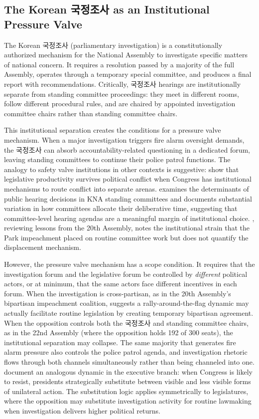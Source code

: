 \documentclass[11pt]{article}
\begin{document}
\subsection{The Korean 국정조사 as an Institutional Pressure Valve}

The Korean 국정조사 (parliamentary investigation) is a constitutionally authorized mechanism for the National Assembly to investigate specific matters of national concern. It requires a resolution passed by a majority of the full Assembly, operates through a temporary special committee, and produces a final report with recommendations. Critically, 국정조사 hearings are institutionally separate from standing committee proceedings: they meet in different rooms, follow different procedural rules, and are chaired by appointed investigation committee chairs rather than standing committee chairs.

This institutional separation creates the conditions for a pressure valve mechanism. When a major investigation triggers fire alarm oversight demands, the 국정조사 can absorb accountability-related questioning in a dedicated forum, leaving standing committees to continue their police patrol functions. The analogy to safety valve institutions in other contexts is suggestive: \citet{edwards1997} show that legislative productivity survives political conflict when Congress has institutional mechanisms to route conflict into separate arenas. \citet{kim2019} examines the determinants of public hearing decisions in KNA standing committees and documents substantial variation in how committees allocate their deliberative time, suggesting that committee-level hearing agendas are a meaningful margin of institutional choice. \citet{kim2020}, reviewing lessons from the 20th Assembly, notes the institutional strain that the Park impeachment placed on routine committee work but does not quantify the displacement mechanism.

However, the pressure valve mechanism has a scope condition. It requires that the investigation forum and the legislative forum be controlled by \textit{different} political actors, or at minimum, that the same actors face different incentives in each forum. When the investigation is cross-partisan, as in the 20th Assembly's bipartisan impeachment coalition, \citet{baum2002} suggests a rally-around-the-flag dynamic may actually facilitate routine legislation by creating temporary bipartisan agreement. When the opposition controls both the 국정조사 and standing committee chairs, as in the 22nd Assembly (where the opposition holds 192 of 300 seats), the institutional separation may collapse. The same majority that generates fire alarm pressure also controls the police patrol agenda, and investigation rhetoric flows through both channels simultaneously rather than being channeled into one. \citet{kaufman2023} document an analogous dynamic in the executive branch: when Congress is likely to resist, presidents strategically substitute between visible and less visible forms of unilateral action. The substitution logic applies symmetrically to legislatures, where the opposition may substitute investigation activity for routine lawmaking when investigation delivers higher political returns.
\end{document}
